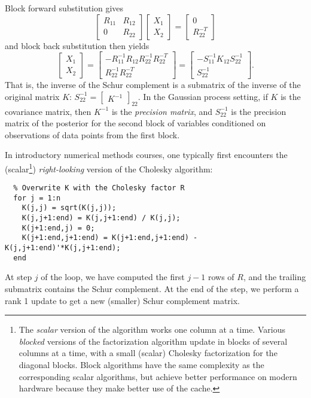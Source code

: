\documentclass[12pt, leqno]{article} %
\begin{document}
Block forward substitution gives
\[
  \begin{bmatrix} R_{11} & R_{12} \\ 0 & R_{22} \end{bmatrix}
  \begin{bmatrix} X_1 \\ X_2 \end{bmatrix} =
  \begin{bmatrix} 0 \\ R_{22}^{-T} \end{bmatrix}
\]
and block back substitution then yields
\[
  \begin{bmatrix} X_1 \\ X_2 \end{bmatrix} =
  \begin{bmatrix} -R_{11}^{-1} R_{12} R_{22}^{-1} R_{22}^{-T}
    \\ R_{22}^{-1} R_{22}^{-T} \end{bmatrix} =
  \begin{bmatrix} -S_{11}^{-1} K_{12} S_{22}^{-1} \\ S_{22}^{-1} \end{bmatrix}.
\]
That is, the inverse of the Schur complement is a submatrix of the
inverse of the original matrix
$K$: $S_{22}^{-1} = \begin{bmatrix} K^{-1} \end{bmatrix}_{22}$.  In
the Gaussian process setting, if $K$ is the covariance matrix, then
$K^{-1}$ is the {\em precision matrix}, and $S_{22}^{-1}$ is the
precision matrix of the posterior for the second block of variables
conditioned on observations of data points from the first block.

In introductory numerical methods courses, one typically first
encounters the (scalar\footnote{The {\em scalar} version of the
  algorithm works one column at a time.  Various {\em blocked} versions
  of the factorization algorithm update in blocks of several columns
  at a time, with a small (scalar) Cholesky factorization for the
  diagonal blocks.  Block algorithms have the same complexity as the
  corresponding scalar algorithms, but achieve better performance on
  modern hardware because they make better use of the cache.
}) {\em right-looking} version of the Cholesky algorithm:
\begin{lstlisting}
  % Overwrite K with the Cholesky factor R
  for j = 1:n
    K(j,j) = sqrt(K(j,j));
    K(j,j+1:end) = K(j,j+1:end) / K(j,j);
    K(j+1:end,j) = 0;
    K(j+1:end,j+1:end) = K(j+1:end,j+1:end) - K(j,j+1:end)'*K(j,j+1:end);
  end
\end{lstlisting}
At step $j$ of the loop, we have computed the first $j-1$ rows of $R$,
and the trailing submatrix contains the Schur complement.  At the end
of the step, we perform a rank 1 update to get a new (smaller) Schur
complement matrix.
\end{document}
